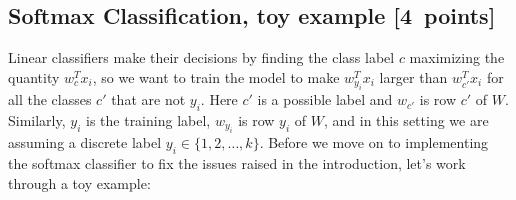 \documentclass{article}
\newcommand\pts[1]{\textcolor{pointscolour}{[#1~points]}}
\begin{document}
\subsection{Softmax Classification, toy example \pts{4}}

Linear classifiers make their decisions by finding the class label $c$ maximizing the quantity $w_c^Tx_i$, so we want to train the model to make $w_{y_i}^Tx_i$ larger than $w_{c'}^Tx_i$ for all the classes $c'$ that are not $y_i$.
Here $c'$ is a possible label and $w_{c'}$ is row $c'$ of $W$. Similarly, $y_i$ is the training label, $w_{y_i}$ is row $y_i$ of $W$, and in this setting we are assuming a discrete label $y_i \in \{1,2,\dots,k\}$. Before we move on to implementing the softmax classifier to fix the issues raised in the introduction, let's work through a toy example:
\end{document}
